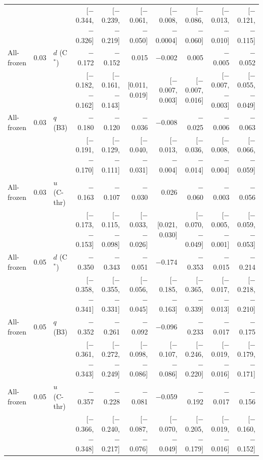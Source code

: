 \begin{tabular}{lllrrrrrrr}
 &  &  & {\scriptsize [$-$0.344, $-$0.326]} & {\scriptsize [$-$0.239, $-$0.219]} & {\scriptsize [$-$0.061, $-$0.050]} & {\scriptsize [$-$0.008, $-$0.0004]} & {\scriptsize [$-$0.086, $-$0.060]} & {\scriptsize [$-$0.013, $-$0.010]} & {\scriptsize [$-$0.121, $-$0.115]} \\
All-frozen & 0.03 & $d$ (C$^*$) & $-$0.172 & $-$0.152 & 0.015 & $-$0.002 & 0.005 & $-$0.005 & $-$0.052 \\
 &  &  & {\scriptsize [$-$0.182, $-$0.162]} & {\scriptsize [$-$0.161, $-$0.143]} & {\scriptsize [0.011, 0.019]} & {\scriptsize [$-$0.007, 0.003]} & {\scriptsize [$-$0.007, 0.016]} & {\scriptsize [$-$0.007, $-$0.003]} & {\scriptsize [$-$0.055, $-$0.049]} \\
All-frozen & 0.03 & $q$ (B3) & $-$0.180 & $-$0.120 & $-$0.036 & $-$0.008 & $-$0.025 & $-$0.006 & $-$0.063 \\
 &  &  & {\scriptsize [$-$0.191, $-$0.170]} & {\scriptsize [$-$0.129, $-$0.111]} & {\scriptsize [$-$0.040, $-$0.031]} & {\scriptsize [$-$0.013, $-$0.004]} & {\scriptsize [$-$0.036, $-$0.014]} & {\scriptsize [$-$0.008, $-$0.004]} & {\scriptsize [$-$0.066, $-$0.059]} \\
All-frozen & 0.03 & $u$ (C-thr) & $-$0.163 & $-$0.107 & $-$0.030 & 0.026 & $-$0.060 & $-$0.003 & $-$0.056 \\
 &  &  & {\scriptsize [$-$0.173, $-$0.153]} & {\scriptsize [$-$0.115, $-$0.098]} & {\scriptsize [$-$0.033, $-$0.026]} & {\scriptsize [0.021, 0.030]} & {\scriptsize [$-$0.070, $-$0.049]} & {\scriptsize [$-$0.005, $-$0.001]} & {\scriptsize [$-$0.059, $-$0.053]} \\
All-frozen & 0.05 & $d$ (C$^*$) & $-$0.350 & $-$0.343 & $-$0.051 & $-$0.174 & $-$0.353 & $-$0.015 & $-$0.214 \\
 &  &  & {\scriptsize [$-$0.358, $-$0.341]} & {\scriptsize [$-$0.355, $-$0.331]} & {\scriptsize [$-$0.056, $-$0.045]} & {\scriptsize [$-$0.185, $-$0.163]} & {\scriptsize [$-$0.365, $-$0.339]} & {\scriptsize [$-$0.017, $-$0.013]} & {\scriptsize [$-$0.218, $-$0.210]} \\
All-frozen & 0.05 & $q$ (B3) & $-$0.352 & $-$0.261 & $-$0.092 & $-$0.096 & $-$0.233 & $-$0.017 & $-$0.175 \\
 &  &  & {\scriptsize [$-$0.361, $-$0.343]} & {\scriptsize [$-$0.272, $-$0.249]} & {\scriptsize [$-$0.098, $-$0.086]} & {\scriptsize [$-$0.107, $-$0.086]} & {\scriptsize [$-$0.246, $-$0.220]} & {\scriptsize [$-$0.019, $-$0.016]} & {\scriptsize [$-$0.179, $-$0.171]} \\
All-frozen & 0.05 & $u$ (C-thr) & $-$0.357 & $-$0.228 & $-$0.081 & $-$0.059 & $-$0.192 & $-$0.017 & $-$0.156 \\
 &  &  & {\scriptsize [$-$0.366, $-$0.348]} & {\scriptsize [$-$0.240, $-$0.217]} & {\scriptsize [$-$0.087, $-$0.076]} & {\scriptsize [$-$0.070, $-$0.049]} & {\scriptsize [$-$0.205, $-$0.179]} & {\scriptsize [$-$0.019, $-$0.016]} & {\scriptsize [$-$0.160, $-$0.152]} \\
\bottomrule
\end{tabular}
